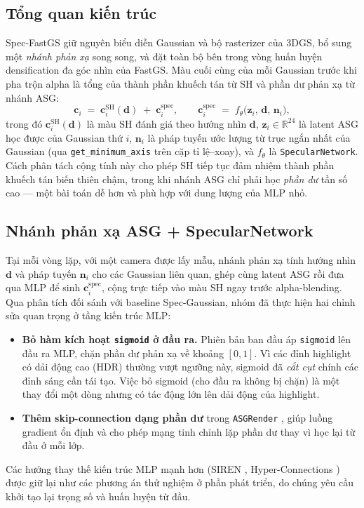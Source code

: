     \subsection{Tổng quan kiến trúc}
    Spec-FastGS giữ nguyên biểu diễn Gaussian và bộ rasterizer của 3DGS, bổ sung một
    \textit{nhánh phản xạ} song song, và đặt toàn bộ bên trong vòng huấn luyện
    densification đa góc nhìn của FastGS. Màu cuối cùng của mỗi Gaussian trước khi
    pha trộn alpha là tổng của thành phần khuếch tán từ SH và phần dư phản xạ từ
    nhánh ASG:
    \[
        \mathbf{c}_i \;=\; \mathbf{c}_i^{\text{SH}}(\mathbf{d})
        \;+\; \mathbf{c}_i^{\text{spec}},
        \qquad
        \mathbf{c}_i^{\text{spec}} \;=\;
        f_\theta\big(\mathbf{z}_i,\, \mathbf{d},\, \mathbf{n}_i\big),
    \]
    trong đó $\mathbf{c}_i^{\text{SH}}(\mathbf{d})$ là màu SH đánh giá theo hướng
    nhìn $\mathbf{d}$, $\mathbf{z}_i \in \mathbb{R}^{24}$ là latent ASG học được của
    Gaussian thứ $i$, $\mathbf{n}_i$ là pháp tuyến ước lượng từ trục ngắn nhất của
    Gaussian (qua \texttt{get\_minimum\_axis} trên cặp tỉ lệ–xoay), và $f_\theta$ là
    \texttt{SpecularNetwork}. Cách phân tách cộng tính này cho phép SH tiếp tục đảm
    nhiệm thành phần khuếch tán biến thiên chậm, trong khi nhánh ASG chỉ phải học
    \textit{phần dư} tần số cao — một bài toán dễ hơn và phù hợp với dung lượng của
    MLP nhỏ.

    \subsection{Nhánh phản xạ ASG + SpecularNetwork}
    Tại mỗi vòng lặp, với một camera được lấy mẫu, nhánh phản xạ tính hướng nhìn
    $\mathbf{d}$ và pháp tuyến $\mathbf{n}_i$ cho các Gaussian liên quan, ghép cùng
    latent ASG rồi đưa qua MLP để sinh $\mathbf{c}_i^{\text{spec}}$, cộng trực tiếp
    vào màu SH ngay trước alpha-blending. Qua phân tích đối sánh với baseline
    Spec-Gaussian, nhóm đã thực hiện hai chỉnh sửa quan trọng ở tầng kiến trúc MLP:
    \begin{itemize}
        \item \textbf{Bỏ hàm kích hoạt \texttt{sigmoid} ở đầu ra.} Phiên bản ban đầu
        áp \texttt{sigmoid} lên đầu ra MLP, chặn phần dư phản xạ về khoảng $[0,1]$.
        Vì các đỉnh highlight có dải động cao (HDR) thường vượt ngưỡng này, sigmoid
        đã \textit{cắt cụt} chính các đỉnh sáng cần tái tạo. Việc bỏ sigmoid (cho
        đầu ra không bị chặn) là một thay đổi một dòng nhưng có tác động lớn lên dải
        động của highlight.
        \item \textbf{Thêm skip-connection dạng phần dư} trong \texttt{ASGRender}
        \cite{resnet,resiterative}, giúp luồng gradient ổn định và cho phép mạng
        tinh chỉnh lặp phần dư thay vì học lại từ đầu ở mỗi lớp.
    \end{itemize}
    Các hướng thay thế kiến trúc MLP mạnh hơn (SIREN \cite{siren}, Hyper-Connections
    \cite{hyperconn}) được giữ lại như các phương án thử nghiệm ở phần phát triển,
    do chúng yêu cầu khởi tạo lại trọng số và huấn luyện từ đầu.

